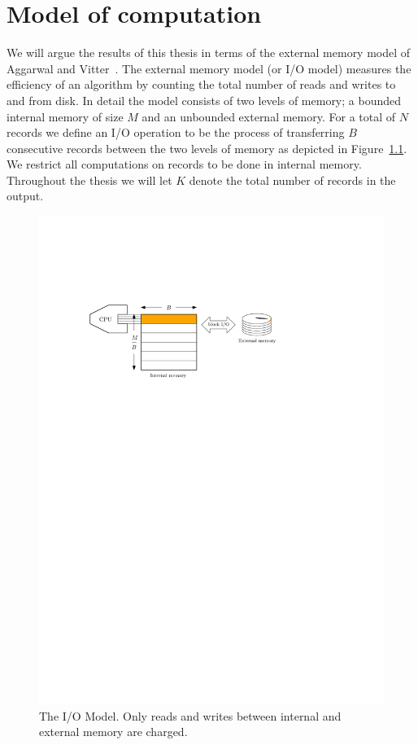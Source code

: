 \documentclass[twoside,11pt,openright]{report}
\begin{document}
\chapter{Model of computation}
\label{chp:iomodel}
We will argue the results of this thesis in terms of the external memory model of Aggarwal and Vitter~\cite{Aggarwal:1988/ICS/48529.48535}.
The external memory model (or I/O model) measures the efficiency of an algorithm by counting the total number of reads and writes to and from disk. In detail the model consists of two levels of memory; a bounded internal memory of size $M$ and an unbounded external memory. For a total of $N$ records we define an I/O operation to be the process of transferring $B$ consecutive records between the two levels of memory as depicted in Figure~\ref{fig:io_model}. We restrict all computations on records to be done in internal memory. Throughout the thesis we will let $K$ denote the total number of records in the output.

\begin{figure}[h]
	\centering
	\includegraphics[width=1\textwidth]{../figures/block_io}
	\caption{The I/O Model. Only reads and writes between internal and external memory are charged.}
	\label{fig:io_model}
\end{figure}
\end{document}

